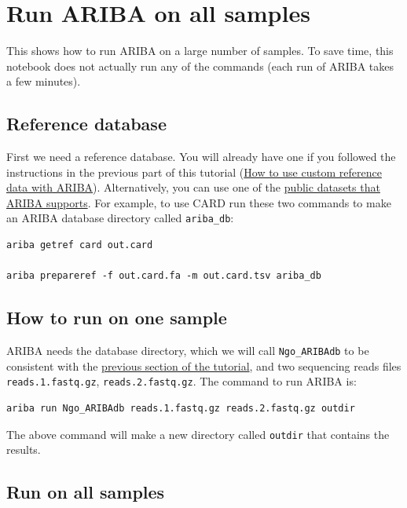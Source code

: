 \documentclass[11pt]{article}
\begin{document}
    \hypertarget{run-ariba-on-all-samples}{%
\section{Run ARIBA on all samples}\label{run-ariba-on-all-samples}}

This shows how to run ARIBA on a large number of samples. To save time,
this notebook does not actually run any of the commands (each run of
ARIBA takes a few minutes).

\hypertarget{reference-database}{%
\subsection{Reference database}\label{reference-database}}

First we need a reference database. You will already have one if you
followed the instructions in the previous part of this tutorial
(\href{make_custom_db.ipynb}{How to use custom reference data with
ARIBA}). Alternatively, you can use one of the
\href{https://github.com/sanger-pathogens/ariba/wiki/Task:-getref}{public
datasets that ARIBA supports}. For example, to use CARD run these two
commands to make an ARIBA database directory called \texttt{ariba\_db}:

\begin{verbatim}
ariba getref card out.card

ariba prepareref -f out.card.fa -m out.card.tsv ariba_db
\end{verbatim}

    \hypertarget{how-to-run-on-one-sample}{%
\subsection{How to run on one sample}\label{how-to-run-on-one-sample}}

ARIBA needs the database directory, which we will call
\texttt{Ngo\_ARIBAdb} to be consistent with the
\href{make_custom_db.ipynb}{previous section of the tutorial}, and two
sequencing reads files \texttt{reads.1.fastq.gz},
\texttt{reads.2.fastq.gz}. The command to run ARIBA is:

\begin{verbatim}
ariba run Ngo_ARIBAdb reads.1.fastq.gz reads.2.fastq.gz outdir
\end{verbatim}

The above command will make a new directory called \texttt{outdir} that
contains the results.

    \hypertarget{run-on-all-samples}{%
\subsection{Run on all samples}\label{run-on-all-samples}}
\end{document}
